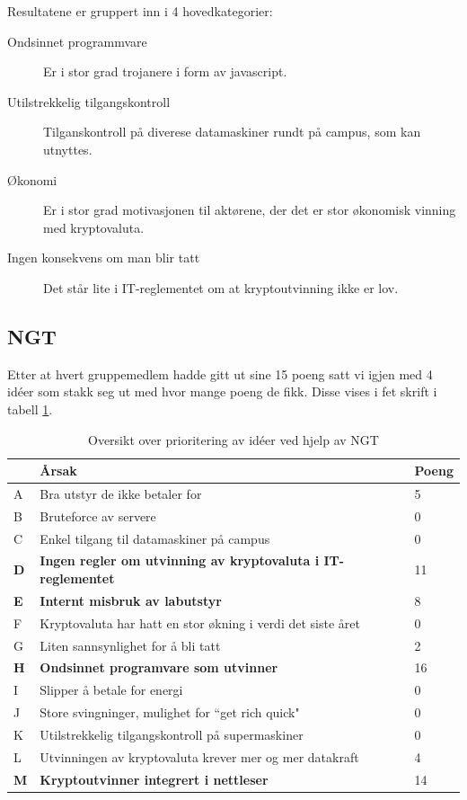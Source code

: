 Resultatene er gruppert inn i 4 hovedkategorier:
\begin{description}
    \item [Ondsinnet programmvare] Er i stor grad trojanere i form av javascript.
    \item [Utilstrekkelig tilgangskontroll] Tilganskontroll på diverese datamaskiner rundt på campus, som kan utnyttes.
    \item [Økonomi] Er i stor grad motivasjonen til aktørene, der det er stor økonomisk vinning med kryptovaluta.
    \item[Ingen konsekvens om man blir tatt] Det står lite i IT-reglementet om at kryptoutvinning ikke er lov.
\end{description}

\subsection{NGT}
Etter at hvert gruppemedlem hadde gitt ut sine 15 poeng satt vi igjen med 4 idéer som stakk seg ut med hvor mange poeng de fikk. Disse vises i fet skrift i tabell \ref{tab:NGT}. 

\begin{table} [H]
    \begin{tabular}{ | m{2em} | m{30em} | m{3em} | }
        \hline
            \cellcolor{yellow}  & \cellcolor{yellow} \textbf{Årsak} & \cellcolor{yellow} Poeng \\
        \hline
           A& Bra utstyr de ikke betaler for & 5 \\
        \hline
          B & Bruteforce av servere & 0 \\
        \hline
          C & Enkel tilgang til datamaskiner på campus & 0 \\
        \hline
         \textbf{D} & \textbf{Ingen regler om utvinning av kryptovaluta i IT-reglementet} & 11 \\
        \hline
          \textbf{E} & \textbf{Internt misbruk av labutstyr} & 8  \\
        \hline
          F & Kryptovaluta har hatt en stor økning i verdi det siste året & 0 \\
        \hline
         G & Liten sannsynlighet for å bli tatt & 2 \\
        \hline
         \textbf{H} & \textbf{Ondsinnet programvare som utvinner} &  16 \\
        \hline
         I & Slipper å betale for energi & 0 \\
        \hline
         J & Store svingninger, mulighet for “get rich quick" & 0 \\
        \hline
         K & Utilstrekkelig tilgangskontroll på supermaskiner & 0 \\
        \hline
         L & Utvinningen av kryptovaluta krever mer og mer datakraft & 4 \\
        \hline
         \textbf{M} & \textbf{Kryptoutvinner integrert i nettleser} & 14 \\
        \hline
    \end{tabular}
    \caption{Oversikt over prioritering av idéer ved hjelp av NGT}
    \label{tab:NGT}
\end{table}

